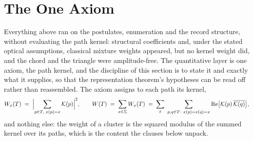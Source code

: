 \section{The One Axiom}\label{sec:axiom}

Everything above ran on the postulates, enumeration and the record structure, without evaluating the path kernel: structural coefficients and, under the stated optical assumptions, classical mixture weights appeared, but no kernel weight did, and the chord and the triangle were amplitude-free. The quantitative layer is one axiom, the path kernel, and the discipline of this section is to state it and exactly what it supplies, so that the representation theorem's hypotheses can be read off rather than reassembled. The axiom assigns to each path its kernel,
\begin{equation}\label{eq:kernel}
W_x(T) \;=\; \Bigl|\sum_{p \in T,\; x(p) = x} \mathcal{K}(p)\Bigr|^{2}, \qquad W(T) \;=\; \sum_{x \in \Sigma} W_x(T) \;=\; \sum_{x}\ \sum_{p, q \in T:\ x(p) = x(q) = x} \mathrm{Re}\bigl[\mathcal{K}(p)\,\overline{\mathcal{K}(q)}\bigr],
\end{equation}
and nothing else: the weight of a cluster is the squared modulus of the summed kernel over its paths, which is the content the clauses below unpack.





